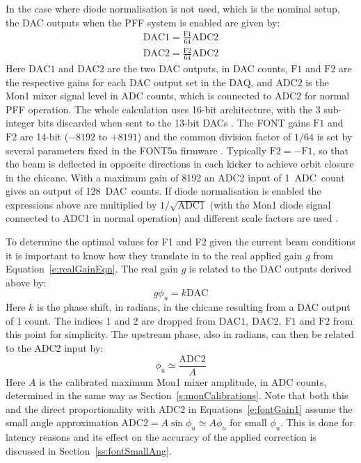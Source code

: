 In the case where diode normalisation is not used, which is the nominal setup, the DAC outputs when the PFF system is enabled are given by:
\begin{eqnarray}
\mathrm{DAC1} = \frac{\mathrm{F1}}{64}\mathrm{ADC2} \nonumber \\ 
\mathrm{DAC2} = \frac{\mathrm{F2}}{64}\mathrm{ADC2} \label{e:fontGain1}
\end{eqnarray}
Here \(\mathrm{DAC1}\) and \(\mathrm{DAC2}\) are the two DAC outputs, in DAC counts, \(\mathrm{F1}\) and \(\mathrm{F2}\) are the respective gains for each DAC output set in the DAQ, and \(\mathrm{ADC2}\) is the Mon1 mixer signal level in ADC counts, which is connected to ADC2 for normal PFF operation. The whole calculation uses 16-bit architecture, with the 3 sub-integer bits discarded when sent to the 13-bit DACs \cite{glennPriv}. The FONT gains \(\mathrm{F1}\) and \(\mathrm{F2}\) are 14-bit (\(-8192\) to \(+8191\)) and the common division factor of \(1/64\) is set by several parameters fixed in the FONT5a firmware \cite{glennPriv}.
Typically \(\mathrm{F2} = -\mathrm{F1}\), so that the beam is deflected in opposite directions in each kicker to achieve orbit closure in the chicane. With a maximum gain of 8192 an ADC2 input of 1~ADC~count gives an output of 128~DAC~counts. If diode normalisation is enabled the expressions above are multiplied by \(1/\sqrt{\mathrm{ADC1}}\) (with the Mon1 diode signal connected to ADC1 in normal operation) and different scale factors are used \cite{glennPriv}.

To determine the optimal values for F1 and F2 given the current beam conditions it is important to know how they translate in to the real applied gain \(g\) from Equation~\ref{e:realGainEqn}. The real gain \(g\) is related to the DAC outputs derived above by:
\begin{equation} \label{e:fontGain2}
g\phi_u = k\mathrm{DAC}
\end{equation}
Here \(k\) is the phase shift, in radians, in the chicane resulting from a DAC output of 1 count. The indices 1 and 2 are dropped from \(\mathrm{DAC1,~DAC2,~F1}\) and \(\mathrm{F2}\) from this point for simplicity. The upstream phase, also in radians, can then be related to the ADC2 input by:
\begin{equation} \label{e:fontGain3}
\phi_u \simeq \frac{\mathrm{ADC2}}{A}
\end{equation}
Here \(A\) is the calibrated maximum Mon1 mixer amplitude, in ADC counts, determined in the same way as Section~\ref{s:monCalibrations}. Note that both this and the direct proportionality with ADC2 in Equations~\ref{e:fontGain1} assume the small angle approximation \(\mathrm{ADC2} = A\sin\phi_u \simeq A\phi_u\) for small \(\phi_u\). This is done for latency reasons \cite{glennPriv} and its effect on the accuracy of the applied correction is discussed in Section~\ref{ss:fontSmallAng}.

